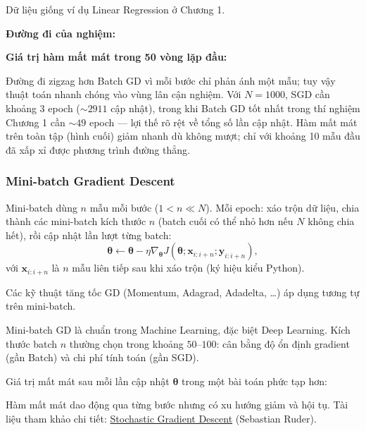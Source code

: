 \begin{vidu}[title={Kết quả SGD trên Linear Regression}]
Dữ liệu giống ví dụ Linear Regression ở Chương 1.

\textbf{Đường đi của nghiệm:}

\textbf{Giá trị hàm mất mát trong 50 vòng lặp đầu:}

Đường đi zigzag hơn Batch GD vì mỗi bước chỉ phản ánh một mẫu; tuy vậy thuật toán nhanh chóng vào vùng lân cận nghiệm. Với $N = 1000$, SGD cần khoảng 3 epoch ($\sim 2911$ cập nhật), trong khi Batch GD tốt nhất trong thí nghiệm Chương 1 cần $\sim 49$ epoch --- lợi thế rõ rệt về tổng số lần cập nhật. Hàm mất mát trên toàn tập (hình cuối) giảm nhanh dù không mượt; chỉ với khoảng 10 mẫu đầu đã xấp xỉ được phương trình đường thẳng.
\end{vidu}

\subsubsection{Mini-batch Gradient Descent}

\begin{dinhnghia}[title={Mini-batch Gradient Descent}]
Mini-batch dùng $n$ mẫu mỗi bước ($1 < n \ll N$). Mỗi epoch: xáo trộn dữ liệu, chia thành các mini-batch kích thước $n$ (batch cuối có thể nhỏ hơn nếu $N$ không chia hết), rồi cập nhật lần lượt từng batch:
\[
 \boldsymbol{\theta} \leftarrow \boldsymbol{\theta} - \eta\nabla_{\boldsymbol{\theta}} J(\boldsymbol{\theta}; \mathbf{x}_{i:i+n}; \mathbf{y}_{i:i+n}),
\]
với $\mathbf{x}_{i:i+n}$ là $n$ mẫu liên tiếp sau khi xáo trộn (ký hiệu kiểu Python).
\end{dinhnghia}

\begin{luuy}[title={Kết hợp với Momentum, Adagrad, Adadelta, \ldots}]
Các kỹ thuật tăng tốc GD (Momentum, Adagrad, Adadelta, \ldots) áp dụng tương tự trên mini-batch.
\end{luuy}

\begin{ynghia}[title={Ứng dụng thực tế}]
Mini-batch GD là chuẩn trong Machine Learning, đặc biệt Deep Learning. Kích thước batch $n$ thường chọn trong khoảng $50$--$100$: cân bằng độ ổn định gradient (gần Batch) và chi phí tính toán (gần SGD).
\end{ynghia}

\begin{vidu}[title={Dao động hàm mất mát}]
Giá trị mất mát sau mỗi lần cập nhật $\boldsymbol{\theta}$ trong một bài toán phức tạp hơn:


Hàm mất mát dao động qua từng bước nhưng có xu hướng giảm và hội tụ. Tài liệu tham khảo chi tiết: \href{http://sebastianruder.com/optimizing-gradient-descent/index.html#stochasticgradientdescent}{Stochastic Gradient Descent} (Sebastian Ruder).
\end{vidu}

